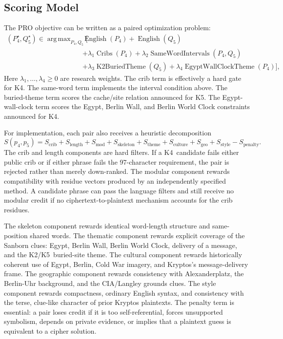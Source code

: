 \documentclass[12pt]{paperFormatting}
\newcommand{\Kfour}{K4}
\newcommand{\Kfive}{K5}
\newcommand{\Ktwo}{K2}
\newcommand{\Score}{S}
\DeclareMathOperator*{\ArgMax}{arg\,max}
\begin{document}
\begin{thesisbody}
\section{Scoring Model}
The PRO objective can be written as a paired optimization problem:
\begin{equation}
\begin{aligned}
    (P_4^\star,Q_5^\star)
    \in
    \ArgMax_{P_4,Q_5}
    \Big[
    &\operatorname{English}(P_4)
    + \operatorname{English}(Q_5) \\
    &+ \lambda_1 \operatorname{Cribs}(P_4)
    + \lambda_2 \operatorname{SameWordIntervals}(P_4,Q_5) \\
    &+ \lambda_3 \operatorname{K2BuriedTheme}(Q_5)
    + \lambda_4 \operatorname{EgyptWallClockTheme}(P_4)
    \Big],
\end{aligned}
\end{equation}
Here $\lambda_1,\ldots,\lambda_4 \geq 0$ are research weights. The crib term is effectively a hard gate for \Kfour. The same-word term implements the interval condition above. The buried-theme term scores the cache/site relation announced for \Kfive. The Egypt-wall-clock term scores the Egypt, Berlin Wall, and Berlin World Clock constraints announced for \Kfour.

For implementation, each pair also receives a heuristic decomposition
\begin{equation}
    \Score(p_4,p_5)
    =
    \Score_{\mathrm{crib}}
    + \Score_{\mathrm{length}}
    + \Score_{\mathrm{mod}}
    + \Score_{\mathrm{skeleton}}
    + \Score_{\mathrm{theme}}
    + \Score_{\mathrm{culture}}
    + \Score_{\mathrm{geo}}
    + \Score_{\mathrm{style}}
    - \Score_{\mathrm{penalty}}.
\end{equation}
The crib and length components are hard filters. If a \Kfour\ candidate fails either public crib or if either phrase fails the 97-character requirement, the pair is rejected rather than merely down-ranked. The modular component rewards compatibility with residue vectors produced by an independently specified method. A candidate phrase can pass the language filters and still receive no modular credit if no ciphertext-to-plaintext mechanism accounts for the crib residues.

The skeleton component rewards identical word-length structure and same-position shared words. The thematic component rewards explicit coverage of the Sanborn clues: Egypt, Berlin Wall, Berlin World Clock, delivery of a message, and the \Ktwo/\Kfive\ buried-site theme. The cultural component rewards historically coherent use of Egypt, Berlin, Cold War imagery, and Kryptos's message-delivery frame. The geographic component rewards consistency with Alexanderplatz, the Berlin-Uhr background, and the CIA/Langley grounds clues. The style component rewards compactness, ordinary English syntax, and consistency with the terse, clue-like character of prior Kryptos plaintexts. The penalty term is essential: a pair loses credit if it is too self-referential, forces unsupported symbolism, depends on private evidence, or implies that a plaintext guess is equivalent to a cipher solution.


\end{thesisbody}
\end{document}
